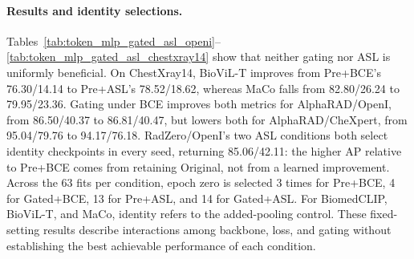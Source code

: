 \paragraph{Results and identity selections.}
Tables~\ref{tab:token_mlp_gated_asl_openi}--\ref{tab:token_mlp_gated_asl_chestxray14} show that neither gating nor ASL is uniformly beneficial. On ChestXray14, BioViL-T improves from Pre+BCE's 76.30/14.14 to Pre+ASL's 78.52/18.62, whereas MaCo falls from 82.80/26.24 to 79.95/23.36. Gating under BCE improves both metrics for AlphaRAD/OpenI, from 86.50/40.37 to 86.81/40.47, but lowers both for AlphaRAD/CheXpert, from 95.04/79.76 to 94.17/76.18. RadZero/OpenI's two ASL conditions both select identity checkpoints in every seed, returning 85.06/42.11: the higher AP relative to Pre+BCE comes from retaining Original, not from a learned improvement. Across the 63 fits per condition, epoch zero is selected 3 times for Pre+BCE, 4 for Gated+BCE, 13 for Pre+ASL, and 14 for Gated+ASL. For BiomedCLIP, BioViL-T, and MaCo, identity refers to the added-pooling control. These fixed-setting results describe interactions among backbone, loss, and gating without establishing the best achievable performance of each condition.




